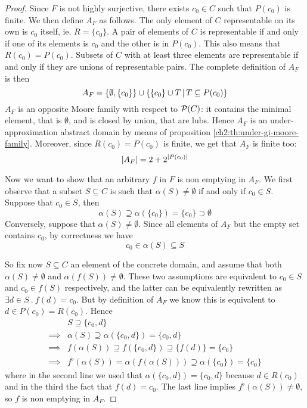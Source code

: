 \begin{proof}
	Since $F$ is not highly surjective, there exists $c_0 \in C$ such that $P(c_0)$ is finite. We then define $A_F$ as follows.
	The only element of $C$ representable on its own is $c_0$ itself, ie. $R = \{ c_0 \}$.
	A pair of elements of $C$ is representable if and only if one of its elements is $c_0$ and the other is in $P(c_0)$. This also means that $R(c_0) = P(c_0)$.
	Subsets of $C$ with at least three elements are representable if and only if they are unions of representable pairs.
	The complete definition of $A_F$ is then
	\[
	A_F = \{ \emptyset, \{ c_0 \} \} \cup \{ \{ c_0 \} \cup T \,\vert\, T \subseteq P(c_0) \}
	\]
	$A_F$ is an opposite Moore family with respect to $\mathcal{P}(C)$: it contains the minimal element, that is $\emptyset$, and is closed by union, that are lubs. Hence $A_F$ is an under-approximation abstract domain by means of proposition \ref{ch2:th:under-gi-moore-family}.
	Moreover, since $R(c_0) = P(c_0)$ is finite, we get that $A_F$ is finite too:
	\[
	\lvert A_F\rvert = 2 + 2^{\lvert P(c_0)\rvert}
	\]

	Now we want to show that an arbitrary $f$ in $F$ is non emptying in $A_F$.
	We first observe that a subset $S \subseteq C$ is such that $\alpha(S) \neq \emptyset$ if and only if $c_0 \in S$. Suppose that $c_0 \in S$, then
	\[
	\alpha(S) \supseteq \alpha(\{ c_0 \}) = \{ c_0 \} \supset \emptyset
	\]
	Conversely, suppose that $\alpha(S) \neq \emptyset$. Since all elements of $A_F$ but the empty set contains $c_0$, by correctness we have
	\[
	c_0 \in \alpha(S) \subseteq S
	\]

	So fix now $S \subseteq C$ an element of the concrete domain, and assume that both $\alpha(S) \neq \emptyset$ and $\alpha(f(S)) \neq \emptyset$.
	These two assumptions are equivalent to $c_0 \in S$ and $c_0 \in f(S)$ respectively, and the latter can be equivalently rewritten as $\exists d \in S\ .\ f(d) = c_0$. But by definition of $A_F$ we know this is equivalent to $d \in P(c_0) = R(c_0)$.
	Hence
	\begin{align*}
		&S \supseteq \{ c_0, d \} \\
		\implies& \alpha(S) \supseteq \alpha(\{ c_0, d \}) = \{ c_0, d \} \\
		\implies& f(\alpha(S)) \supseteq f(\{ c_0, d \}) \supseteq \{ f(d) \} = \{ c_0 \} \\
		\implies& f^{\flat}(\alpha(S)) = \alpha(f(\alpha(S))) \supseteq \alpha(\{ c_0 \}) = \{ c_0 \}
	\end{align*}
	where in the second line we used that $\alpha(\{ c_0, d \}) = \{ c_0, d \}$ because $d \in R(c_0)$ and in the third the fact that $f(d) = c_0$.
	The last line implies $f^{\flat}(\alpha(S)) \neq \emptyset$, so $f$ is non emptying in $A_F$.
\end{proof}

